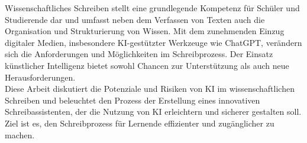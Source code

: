 \documentclass[../main.tex]{subfiles}
\begin{document}
Wissenschaftliches Schreiben stellt eine grundlegende Kompetenz für Schüler und Studierende 
dar und umfasst neben dem Verfassen von Texten auch die Organisation und Strukturierung von Wissen. 
Mit dem zunehmenden Einzug digitaler Medien, insbesondere KI-gestützter Werkzeuge wie ChatGPT, verändern 
sich die Anforderungen und Möglichkeiten im Schreibprozess. Der Einsatz künstlicher Intelligenz bietet sowohl 
Chancen zur Unterstützung als auch neue Herausforderungen.\\
Diese Arbeit diskutiert die Potenziale und Risiken von KI im wissenschaftlichen Schreiben und beleuchtet den 
Prozess der Erstellung eines innovativen Schreibassistenten, der die Nutzung von KI erleichtern und sicherer gestalten soll.
 Ziel ist es, den Schreibprozess für Lernende effizienter und zugänglicher zu machen.
\end{document}
